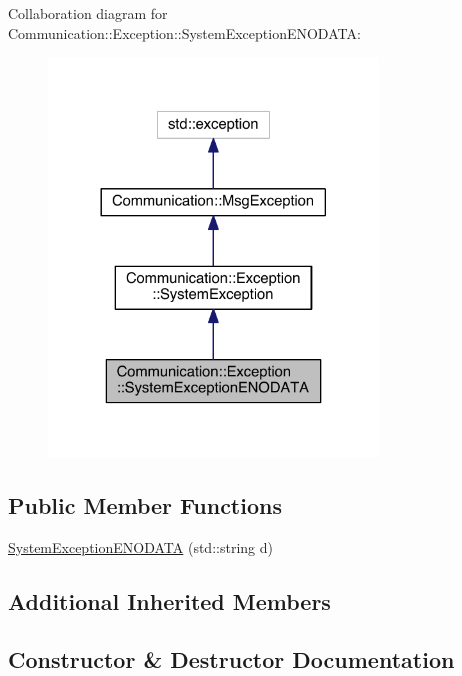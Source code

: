 Collaboration diagram for Communication\+:\+:Exception\+:\+:System\+Exception\+E\+N\+O\+D\+A\+T\+A\+:\nopagebreak
\begin{figure}[H]
\begin{center}
\leavevmode
\includegraphics[width=248pt]{class_communication_1_1_exception_1_1_system_exception_e_n_o_d_a_t_a__coll__graph}
\end{center}
\end{figure}
\subsection*{Public Member Functions}
\begin{DoxyCompactItemize}
\item 
\hyperlink{class_communication_1_1_exception_1_1_system_exception_e_n_o_d_a_t_a_a04752b9241fb5a3a582b62cf458a29da}{System\+Exception\+E\+N\+O\+D\+A\+T\+A} (std\+::string d)
\end{DoxyCompactItemize}
\subsection*{Additional Inherited Members}


\subsection{Constructor \& Destructor Documentation}
\hypertarget{class_communication_1_1_exception_1_1_system_exception_e_n_o_d_a_t_a_a04752b9241fb5a3a582b62cf458a29da}{}
